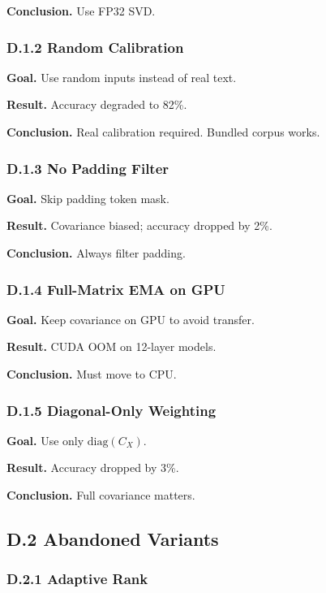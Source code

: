 \textbf{Conclusion.} Use FP32 SVD.

\subsubsection{D.1.2 Random Calibration}

\textbf{Goal.} Use random inputs instead of real text.

\textbf{Result.} Accuracy degraded to 82\%.

\textbf{Conclusion.} Real calibration required. Bundled corpus works.

\subsubsection{D.1.3 No Padding Filter}

\textbf{Goal.} Skip padding token mask.

\textbf{Result.} Covariance biased; accuracy dropped by 2\%.

\textbf{Conclusion.} Always filter padding.

\subsubsection{D.1.4 Full-Matrix EMA on GPU}

\textbf{Goal.} Keep covariance on GPU to avoid transfer.

\textbf{Result.} CUDA OOM on 12-layer models.

\textbf{Conclusion.} Must move to CPU.

\subsubsection{D.1.5 Diagonal-Only Weighting}

\textbf{Goal.} Use only $\mathrm{diag}(C_X)$.

\textbf{Result.} Accuracy dropped by 3\%.

\textbf{Conclusion.} Full covariance matters.

\subsection{D.2 Abandoned Variants}

\subsubsection{D.2.1 Adaptive Rank}

